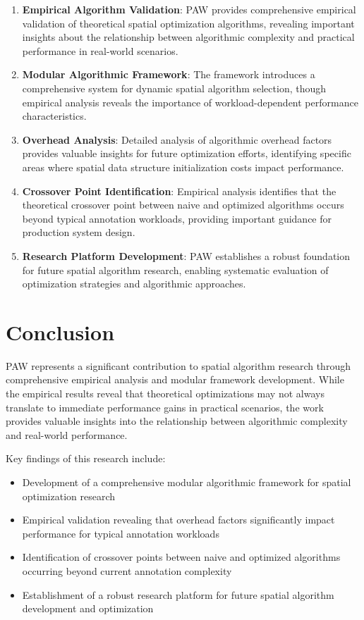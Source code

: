 \documentclass[10pt]{article}
\begin{document}
\begin{enumerate}
    \item \textbf{Empirical Algorithm Validation}: PAW provides comprehensive empirical validation of theoretical spatial optimization algorithms, revealing important insights about the relationship between algorithmic complexity and practical performance in real-world scenarios.
    
    \item \textbf{Modular Algorithmic Framework}: The framework introduces a comprehensive system for dynamic spatial algorithm selection, though empirical analysis reveals the importance of workload-dependent performance characteristics.
    
    \item \textbf{Overhead Analysis}: Detailed analysis of algorithmic overhead factors provides valuable insights for future optimization efforts, identifying specific areas where spatial data structure initialization costs impact performance.
    
    \item \textbf{Crossover Point Identification}: Empirical analysis identifies that the theoretical crossover point between naive and optimized algorithms occurs beyond typical annotation workloads, providing important guidance for production system design.
    
    \item \textbf{Research Platform Development}: PAW establishes a robust foundation for future spatial algorithm research, enabling systematic evaluation of optimization strategies and algorithmic approaches.
\end{enumerate}

\section{Conclusion}

PAW represents a significant contribution to spatial algorithm research through comprehensive empirical analysis and modular framework development. While the empirical results reveal that theoretical optimizations may not always translate to immediate performance gains in practical scenarios, the work provides valuable insights into the relationship between algorithmic complexity and real-world performance.

Key findings of this research include:

\begin{itemize}
    \item Development of a comprehensive modular algorithmic framework for spatial optimization research
    \item Empirical validation revealing that overhead factors significantly impact performance for typical annotation workloads
    \item Identification of crossover points between naive and optimized algorithms occurring beyond current annotation complexity
    \item Establishment of a robust research platform for future spatial algorithm development and optimization
\end{itemize}
\end{document}
